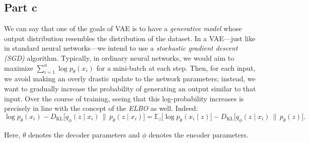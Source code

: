 \subsection{Part c}
We can say that one of the goals of VAE is to have a \emph{generative model} whose output distribution 
resembles the distribution of the dataset. In a VAE---just like in standard neural networks---we intend to use 
a \emph{stochastic gradient descent (SGD)} algorithm. Typically, in ordinary neural networks, we would aim to maximize 
\(\sum_{i=1}^{n} \log p_{\theta}(x_i)\) for a mini-batch at each step. Then, for each input, we avoid making 
an overly drastic update to the network parameters; instead, we want to gradually increase the probability 
of generating an output similar to that input. Over the course of training, seeing that this log-probability 
increases is precisely in line with the concept of the \emph{ELBO} as well. Indeed:
\[
\log p_{\theta}(x_i)
- D_{\mathrm{KL}}\bigl[q_{\phi}(z \mid x_i) \,\|\, p_{\theta}(z \mid x_i)\bigr]
= \mathbb{E}_{z}\bigl[\log p_{\theta}(x_i \mid z)\bigr]
- D_{\mathrm{KL}}\bigl[q_{\phi}(z \mid x_i) \,\|\, p_{\theta}(z)\bigr].
\]

Here, \(\theta\) denotes the decoder parameters and \(\phi\) denotes the encoder parameters.

